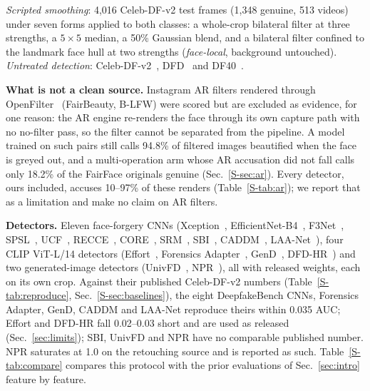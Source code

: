 \documentclass[conference]{IEEEtran}
\begin{document}
\emph{Scripted smoothing}: 4,016 Celeb-DF-v2 test frames (1,348 genuine, 513 videos)
under seven forms applied to both classes: a whole-crop bilateral filter at three strengths, a $5\times5$ median, a 50\%
Gaussian blend, and a bilateral filter confined to the landmark face hull at two strengths (\emph{face-local}, background
untouched). \emph{Untreated detection}: Celeb-DF-v2~\cite{celebdf}, DFD~\cite{dfd} and DF40~\cite{df40}. 

\textbf{What is not a clean source.} Instagram AR filters rendered through OpenFilter~\cite{openfilter2022} (FairBeauty, B-LFW) were scored but are excluded as evidence, for one reason: the AR engine re-renders the face through its own capture path with no no-filter pass, so the filter cannot be separated from the pipeline. A model trained on such pairs still calls 94.8\% of filtered images beautified when the face is greyed out,
and a multi-operation arm whose AR accusation did not fall calls only 18.2\% of the FairFace originals genuine (Sec.~\ref{S-sec:ar}).
Every detector, ours included, accuses 10--97\% of these renders (Table~\ref{S-tab:ar}); we report that as a limitation and
make no claim on AR filters.

\textbf{Detectors.} Eleven face-forgery CNNs (Xception~\cite{xception}, EfficientNet-B4~\cite{efficientnet},
F3Net~\cite{f3net}, SPSL~\cite{spsl}, UCF~\cite{ucf}, RECCE~\cite{recce}, CORE~\cite{core}, SRM~\cite{srm}, SBI~\cite{sbi},
CADDM~\cite{caddm}, LAA-Net~\cite{laanet}), four CLIP ViT-L/14 detectors (Effort~\cite{effort}, Forensics
Adapter~\cite{forensicsadapter}, GenD~\cite{gend2026}, DFD-HR~\cite{dfdhr2026}) and two generated-image detectors
(UnivFD~\cite{univfd}, NPR~\cite{npr}), all with released weights, each on its own crop. Against their published Celeb-DF-v2 numbers (Table~\ref{S-tab:reproduce}, Sec.~\ref{S-sec:baselines}), the eight DeepfakeBench CNNs, Forensics Adapter, GenD, CADDM and LAA-Net reproduce theirs within 0.035 AUC; Effort and DFD-HR fall 0.02--0.03 short and are used as released (Sec.~\ref{sec:limits}); SBI, UnivFD and NPR have no comparable published number. NPR saturates at 1.0 on the
retouching source and is reported as such. Table~\ref{S-tab:compare} compares this protocol with the prior evaluations of Sec.~\ref{sec:intro} feature by feature.
\end{document}
